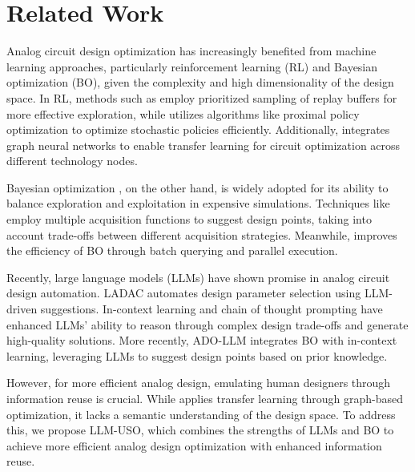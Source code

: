 \section{Related Work}
Analog circuit design optimization has increasingly benefited from machine learning approaches, particularly reinforcement learning (RL) and Bayesian optimization (BO), given the complexity and high dimensionality of the design space. In RL, methods such as \cite{prl} employ prioritized sampling of replay buffers for more effective exploration, while \cite{autockt} utilizes algorithms like proximal policy optimization \cite{ppo} to optimize stochastic policies efficiently. Additionally, \cite{gcn_rl} integrates graph neural networks to enable transfer learning for circuit optimization across different technology nodes.

Bayesian optimization \cite{BO}, on the other hand, is widely adopted for its ability to balance exploration and exploitation in expensive simulations. Techniques like \cite{batch_BO} employ multiple acquisition functions to suggest design points, taking into account trade-offs between different acquisition strategies. Meanwhile, \cite{parallel_BO} improves the efficiency of BO through batch querying and parallel execution.

Recently, large language models (LLMs) have shown promise in analog circuit design automation. LADAC \cite{LADAC} automates design parameter selection using LLM-driven suggestions. In-context learning \cite{in_context_learning} and chain of thought prompting \cite{chain_of_thought} have enhanced LLMs’ ability to reason through complex design trade-offs and generate high-quality solutions. More recently, ADO-LLM \cite{ado-llm} integrates BO with in-context learning, leveraging LLMs to suggest design points based on prior knowledge.

However, for more efficient analog design, emulating human designers through information reuse is crucial. While \cite{gcn_rl} applies transfer learning through graph-based optimization, it lacks a semantic understanding of the design space. To address this, we propose LLM-USO, which combines the strengths of LLMs and BO to achieve more efficient analog design optimization with enhanced information reuse.